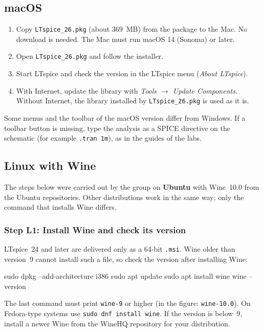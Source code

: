 \subsection{macOS}
\begin{enumerate}[itemsep=2pt]
  \item Copy \texttt{LTspice\_26.pkg} (about 369~MB) from the package to the Mac. No download is needed.
        The Mac must run macOS 14 (Sonoma) or later.
  \item Open \texttt{LTspice\_26.pkg} and follow the installer.
  \item Start LTspice and check the version in the LTspice menu (\textit{About LTspice}).
  \item With Internet, update the library with \textit{Tools $\rightarrow$ Update Components}. Without Internet, the
        library installed by \texttt{LTspice\_26.pkg} is used as it is.
\end{enumerate}
\begin{tipbox}
Some menus and the toolbar of the macOS version differ from Windows. If a toolbar button is missing, type the
analysis as a SPICE directive on the schematic (for example \texttt{.tran 1m}), as in the guides of the labs.
\end{tipbox}

\subsection{Linux with Wine}\label{sec:linux}
The steps below were carried out by the group on \textbf{Ubuntu} with Wine~10.0 from the Ubuntu
repositories. Other distributions work in the same way; only the command that installs Wine differs.

\subsubsection*{Step L1: Install Wine and check its version}
LTspice~24 and later are delivered only as a 64-bit \texttt{.msi}. Wine older than version~9 cannot install
such a file, so check the version after installing Wine:
\begin{bash}
sudo dpkg --add-architecture i386
sudo apt update
sudo apt install wine
wine --version
\end{bash}
The last command must print \texttt{wine-9} or higher (in the figure: \texttt{wine-10.0}).
On Fedora-type systems use \texttt{sudo dnf install wine}. If the version is below~9, install a newer Wine
from the WineHQ repository for your distribution.

